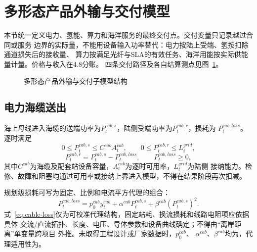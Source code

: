 \section{多形态产品外输与交付模型}
\label{sec:product-delivery}

本节统一定义电力、氢能、算力和海洋服务的最终交付点。交付变量只记录越过合同或服务
边界的实际量，不能用设备输入功率替代：电力按陆上受端、氢按扣除通道损失后的接收量、
算力按满足光纤与SLA的有效任务、海洋用能按实际供能量计量。价格与收入在4.8分账。
四条交付路径及各自结算测点见图~\ref{fig:delivery-model}。

\begin{figure}[H]
\centering
\resizebox{0.94\textwidth}{!}{}
\caption{多形态产品外输与交付子模型结构}
\label{fig:delivery-model}
\end{figure}

\subsection{电力海缆送出}

海上母线进入海缆的送端功率为$P_t^{cab,s}$，陆侧受端功率为$P_t^{cab,r}$，损耗为
$P_t^{cab,loss}$。逐时满足
\begin{equation}
0\le P_t^{cab,s}\le C^{cab}A_t^{cab},
\qquad 0\le P_t^{cab,r}\le L_t^{grid},
\label{eq:cable-send}
\end{equation}
\begin{equation}
P_t^{cab,r}=P_t^{cab,s}-P_t^{cab,loss},
\qquad P_t^{cab,loss}\ge 0,
\label{eq:cable-receive}
\end{equation}
其中$C^{cab}$为海缆及配套站设备容量，$A_t^{cab}$为逐时可用率，$L_t^{grid}$为陆侧
接纳能力。检修、故障和阻塞均通过可用率或接纳上界进入模型，不得在结果阶段再次扣减。

规划级损耗可写为固定、比例和电流平方代理的组合：
\begin{equation}
P_t^{cab,loss}=p_0^{cab}y_t^{cab}
+\alpha^{cab}P_t^{cab,s}
+\beta^{cab}\left(P_t^{cab,s}\right)^2.
\label{eq:cable-loss}
\end{equation}
式~\eqref{eq:cable-loss}仅为可校准代理结构，固定站耗、换流损耗和线路电阻项应依据具体
交流/直流拓扑、长度、电压、导体参数和设备曲线确定；不得由“离岸距离”单变量跨项目
外推\cite{nrel-transmission}。未取得工程设计或厂家数据时，$p_0^{cab}$、
$\alpha^{cab}$、$\beta^{cab}$均为\assumptiontag，代理适用性为\verifytag。

